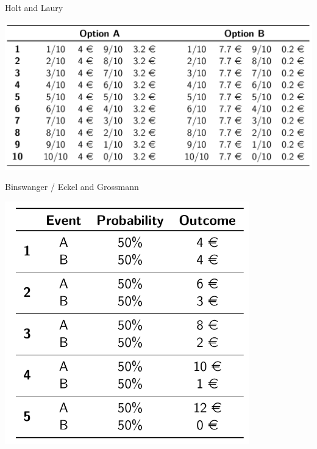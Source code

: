 \documentclass[
  ignorenonframetext,
]{beamer}
\begin{document}
\begin{frame}{Holt and Laury}
\protect\hypertarget{holt-and-laury}{}

\includegraphics[width=8.33333in,height=\textheight]{HL.png}

\end{frame}

\begin{frame}{Binswanger / Eckel and Grossmann}
\protect\hypertarget{binswanger-eckel-and-grossmann}{}

\includegraphics[width=4.16667in,height=\textheight]{EG.png}

\end{frame}
\end{document}

